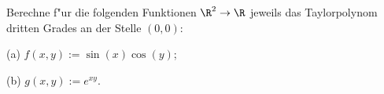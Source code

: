 \begin{prob}
Berechne f"ur die folgenden Funktionen $\R^2\to \R$ jeweils das Taylorpolynom dritten Grades an der Stelle $(0,0)$:

(a) $f(x,y):=\sin(x)\cos(y)$;

(b) $g(x,y):=e^{xy}$.
\end{prob}

